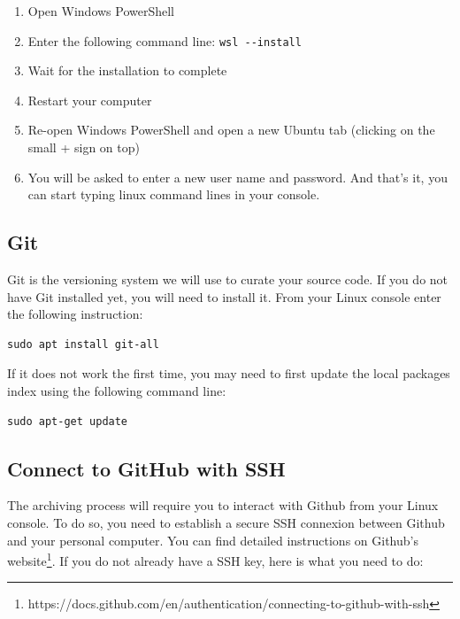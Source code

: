 \documentclass[]{article}
\newcommand{\passthrough}[1]{#1}
\providecommand{\tightlist}{%
  \setlength{\itemsep}{0pt}\setlength{\parskip}{0pt}}
\begin{document}
\begin{enumerate}
\def\labelenumi{\arabic{enumi})}
\tightlist
\item
  Open Windows PowerShell
\item
  Enter the following command line:
  \passthrough{\lstinline!wsl --install!}
\item
  Wait for the installation to complete
\item
  Restart your computer
\item
  Re-open Windows PowerShell and open a new Ubuntu tab (clicking on the
  small + sign on top)
\item
  You will be asked to enter a new user name and password. And that's
  it, you can start typing linux command lines in your console.
\end{enumerate}

\hypertarget{git}{%
\subsection{Git}\label{git}}

Git is the versioning system we will use to curate your source code. If
you do not have Git installed yet, you will need to install it. From
your Linux console enter the following instruction:

\begin{lstlisting}
sudo apt install git-all
\end{lstlisting}

If it does not work the first time, you may need to first update the
local packages index using the following command line:

\begin{lstlisting}
sudo apt-get update 
\end{lstlisting}

\hypertarget{connect-to-github-with-ssh}{%
\subsection{Connect to GitHub with
SSH}\label{connect-to-github-with-ssh}}

The archiving process will require you to interact with Github from your
Linux console. To do so, you need to establish a secure SSH connexion
between Github and your personal computer. You can find detailed
instructions on Github's website\footnote{https://docs.github.com/en/authentication/connecting-to-github-with-ssh}.
If you do not already have a SSH key, here is what you need to do:
\end{document}
